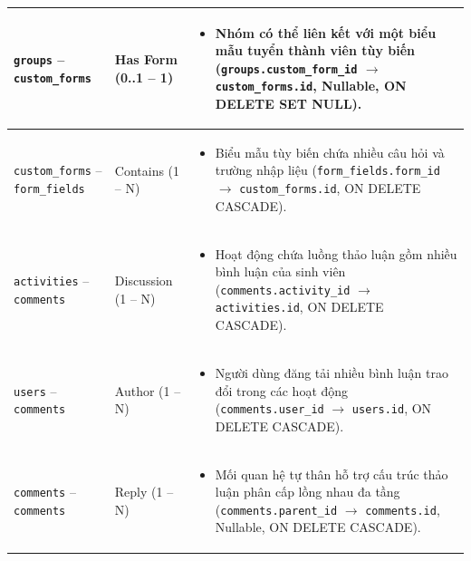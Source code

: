 \begin{longtable}{|p{}|p{}|p{}|}
    \texttt{groups} -- \texttt{custom\_forms} & Has Form \newline (0..1 -- 1) & 
    \begin{itemize}
        \item Nhóm có thể liên kết với một biểu mẫu tuyển thành viên tùy biến (\texttt{groups.custom\_form\_id} $\rightarrow$ \texttt{custom\_forms.id}, Nullable, ON DELETE SET NULL).
    \end{itemize} \\ \hline

    \texttt{custom\_forms} -- \texttt{form\_fields} & Contains \newline (1 -- N) & 
    \begin{itemize}
        \item Biểu mẫu tùy biến chứa nhiều câu hỏi và trường nhập liệu (\texttt{form\_fields.form\_id} $\rightarrow$ \texttt{custom\_forms.id}, ON DELETE CASCADE).
    \end{itemize} \\ \hline

    \texttt{activities} -- \texttt{comments} & Discussion \newline (1 -- N) & 
    \begin{itemize}
        \item Hoạt động chứa luồng thảo luận gồm nhiều bình luận của sinh viên (\texttt{comments.activity\_id} $\rightarrow$ \texttt{activities.id}, ON DELETE CASCADE).
    \end{itemize} \\ \hline

    \texttt{users} -- \texttt{comments} & Author \newline (1 -- N) & 
    \begin{itemize}
        \item Người dùng đăng tải nhiều bình luận trao đổi trong các hoạt động (\texttt{comments.user\_id} $\rightarrow$ \texttt{users.id}, ON DELETE CASCADE).
    \end{itemize} \\ \hline

    \texttt{comments} -- \texttt{comments} & Reply \newline (1 -- N) & 
    \begin{itemize}
        \item Mối quan hệ tự thân hỗ trợ cấu trúc thảo luận phân cấp lồng nhau đa tầng (\texttt{comments.parent\_id} $\rightarrow$ \texttt{comments.id}, Nullable, ON DELETE CASCADE).
    \end{itemize} \\ \hline


\end{longtable}
